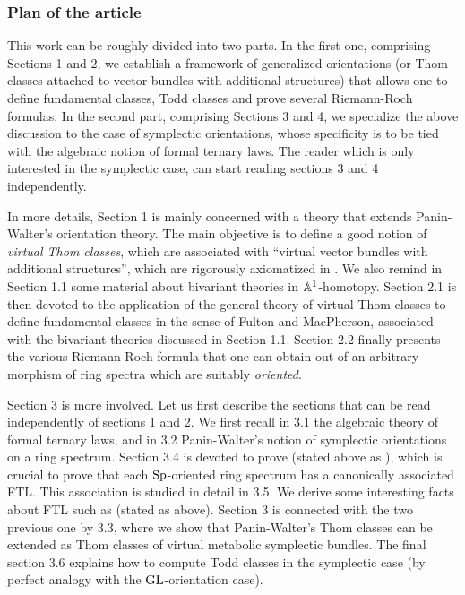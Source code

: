 \documentclass[11pt,leqno]{amsart}
\theoremstyle{remark}
\theoremstyle{definition}
\numberwithin{equation}{thm}
\begin{document}
\subsubsection{Plan of the article}
This work can be roughly divided into two parts.
 In the first one, comprising Sections 1 and 2,
 we establish a framework of generalized orientations
 (or Thom classes attached to vector bundles with additional structures)
 that allows one to define fundamental classes, Todd classes and prove several
 Riemann-Roch formulas.
 In the second part, comprising Sections 3 and 4,
 we specialize the above discussion to the case of symplectic orientations,
 whose specificity is to be tied with the algebraic notion of formal ternary laws.
 The reader which is only interested in the symplectic case, can
 start reading sections 3 and 4 independently.

In more details, Section 1 is mainly concerned with a theory
 that extends Panin-Walter's orientation theory. The main objective is to define 
 a good notion of \emph{virtual Thom classes},
 which are associated with ``virtual vector bundles with additional structures'',
 which are rigorously axiomatized in .
 We also remind  in Section 1.1 some material about bivariant theories in $\AA^1$-homotopy.
 Section 2.1 is then devoted to the application of the general theory of virtual Thom classes
 to define fundamental classes in the sense of Fulton and MacPherson,
 associated with the bivariant theories discussed in Section 1.1.
Section 2.2 finally presents the various Riemann-Roch formula that one
 can obtain out of an arbitrary morphism of ring spectra which are suitably
 \emph{oriented}.

Section 3 is more involved.
 Let us first describe the sections that can be read independently of sections 1 and 2.
 We first recall in 3.1 the algebraic theory of formal ternary laws,
 and in 3.2 Panin-Walter's notion of symplectic orientations on a ring spectrum.
 Section 3.4 is devoted to prove  (stated above as ),
 which is crucial to prove that each $\Sp$-oriented ring spectrum
 has a canonically associated FTL. This association is studied in detail in 3.5.
 We derive some interesting facts about FTL such as 
 (stated as  above).
 Section 3 is connected with the two previous one by 3.3,
 where we show that Panin-Walter's Thom classes can be extended as Thom classes
 of virtual metabolic symplectic bundles. The final section 3.6 explains
 how to compute Todd classes in the symplectic case
 (by perfect analogy with the $\GL$-orientation case).
\end{document}
